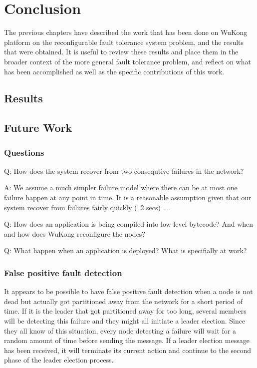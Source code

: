 \cleardoublepage
\singlespacing
\chapter{Conclusion}
\label{c:conclusion}
\doublespacing\nointerlineskip

The previous chapters have described the work that has been done on WuKong
platform on the reconfigurable fault tolerance system problem, and the results
that were obtained. It is useful to review these results and place them in the
broader context of the more general fault tolerance problem, and reﬂect on what has
been accomplished as well as the speciﬁc contributions of this work.

\section{Results}

\section{Future Work}


\subsection{Questions}

Q: How does the system recover from two consequtive failures in the network?

A: We assume a much simpler failure model where there can be at most one
failure happen at any point in time. It is a reasonable assumption given that
our system recover from failures fairly quickly (~2 secs) ....


Q: How does an application is being compiled into low level bytecode? And when
and how does WuKong reconfigure the nodes?


Q: What happen when an application is deployed? What is specifially at work?

\subsection{False positive fault detection}

It appears to be possible to have false positive fault detection when a node is not dead but actually got partitioned away from the network for a short period of time. If it is the leader that got partitioned away for too long, several members will be detecting this failure and they might all initiate a leader election. Since they all know of this situation, every node detecting a failure will wait for a random amount of time before sending the message. If a leader election message has been received, it will terminate its current action and continue to the second phase of the leader election process.

